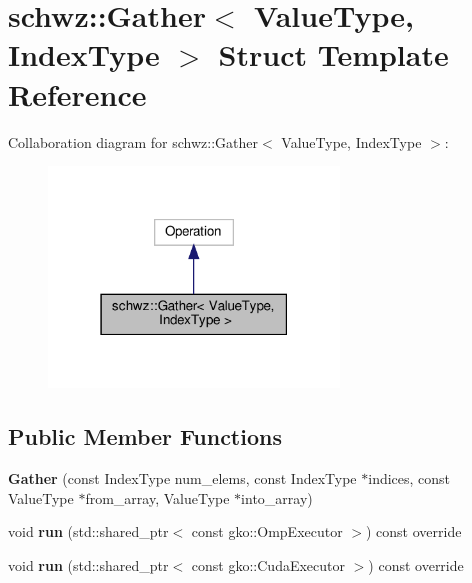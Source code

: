 \hypertarget{structschwz_1_1Gather}{}\section{schwz\+:\+:Gather$<$ Value\+Type, Index\+Type $>$ Struct Template Reference}
\label{structschwz_1_1Gather}


Collaboration diagram for schwz\+:\+:Gather$<$ Value\+Type, Index\+Type $>$\+:
\nopagebreak
\begin{figure}[H]
\begin{center}
\leavevmode
\includegraphics[width=219pt]{structschwz_1_1Gather__coll__graph}
\end{center}
\end{figure}
\subsection*{Public Member Functions}
\begin{DoxyCompactItemize}
\item 
\mbox{\label{structschwz_1_1Gather_a6ef62ccea5b0bc6fb485459215abcc97}} 
{\bfseries Gather} (const Index\+Type num\+\_\+elems, const Index\+Type $\ast$indices, const Value\+Type $\ast$from\+\_\+array, Value\+Type $\ast$into\+\_\+array)
\item 
\mbox{\label{structschwz_1_1Gather_a78567471344a9c03fabc5868431a5338}} 
void {\bfseries run} (std\+::shared\+\_\+ptr$<$ const gko\+::\+Omp\+Executor $>$) const override
\item 
\mbox{\label{structschwz_1_1Gather_a2ba1eb7e12a81bbee46bf0df67ad6640}} 
void {\bfseries run} (std\+::shared\+\_\+ptr$<$ const gko\+::\+Cuda\+Executor $>$) const override
\end{DoxyCompactItemize}
